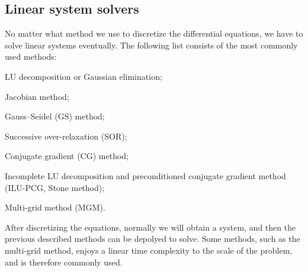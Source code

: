 \documentclass[english, nochinese]{pkupaper}
\begin{document}
\subsection{Linear system solvers}

No matter what method we use to discretize the differential equations, we have to solve linear systems eventually.
The following list consists of the most commonly used methods:
\begin{partlist}
\item LU decomposition or Gaussian elimination;
\item Jacobian method;
\item Gauss--Seidel (GS) method;
\item Successive over-relaxation (SOR);
\item Conjugate gradient (CG) method;
\item Incomplete LU decomposition and preconditioned conjugate gradient method (ILU-PCG, Stone method);
\item Multi-grid method (MGM).
\end{partlist}

After discretizing the equations, normally we will obtain a system, and then the previous described methods can be depolyed to solve. Some methods, such as the multi-grid method, enjoys a linear time complexity to the scale of the problem, and is therefore commonly used.


\end{document}
